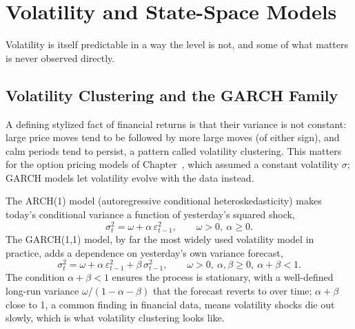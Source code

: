 \documentclass[../ai_in_finance]{subfiles}
\begin{document}
\section{Volatility and State-Space Models}

Volatility is itself predictable in a way the level is not, and some of what matters is never observed directly.

\subsection{Volatility Clustering and the GARCH Family}
\label{sec:garch}

A defining stylized fact of financial returns is that their variance is not constant: large price moves tend to be followed by more large moves (of either sign), and calm periods tend to persist, a pattern called volatility clustering. This matters for the option pricing models of Chapter~, which assumed a constant volatility $\sigma$; GARCH models let volatility evolve with the data instead.

The ARCH(1) model (autoregressive conditional heteroskedasticity) makes today's conditional variance a function of yesterday's squared shock,
\begin{equation*}
\sigma_t^2 = \omega + \alpha\, \varepsilon_{t-1}^2, \qquad \omega > 0,\ \alpha \ge 0.
\end{equation*}
The GARCH(1,1) model, by far the most widely used volatility model in practice, adds a dependence on yesterday's own variance forecast,
\begin{equation}
\label{eq:timeseries-garch}
\sigma_t^2 = \omega + \alpha\, \varepsilon_{t-1}^2 + \beta\, \sigma_{t-1}^2, \qquad \omega > 0,\ \alpha, \beta \ge 0,\ \alpha+\beta < 1.
\end{equation}
The condition $\alpha + \beta < 1$ ensures the process is stationary, with a well-defined long-run variance $\omega / (1-\alpha-\beta)$ that the forecast reverts to over time; $\alpha + \beta$ close to 1, a common finding in financial data, means volatility shocks die out slowly, which is what volatility clustering looks like.
\end{document}
